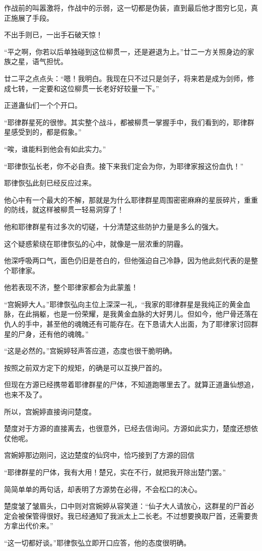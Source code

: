 \begin{this_body}
作战前的叫嚣激将，作战中的示弱，这一切都是伪装，直到最后他才图穷匕见，真正施展了手段。

不出手则已，一出手石破天惊！

“平之啊，你若以后单独碰到这位柳贯一，还是避退为上。”廿二一方关照身边的家族之星，语气担忧。

廿二平之点点头：“嗯！我明白。我现在只不过只是剑子，将来若是成为剑师，修成七转，一定要和这位柳贯一长老好好较量一下。”

正道蛊仙们一个个开口。

“耶律群星死的很惨。其实整个战斗，都被柳贯一掌握手中，我们看到的，耶律群星感受到的，都是假象。”

“唉，谁能料到他会有如此实力。”

“耶律恢弘长老，你不必自责。接下来我们定会为你，为耶律家报这份血仇！”

耶律恢弘此刻已经反应过来。

他心中有一个最大的不解，那就是为什么耶律群星周围密密麻麻的星辰碎片，重重的防线，就这样被柳贯一轻易洞穿了！

他和耶律群星有过多次的切磋，十分清楚这些防护力量是多么的强大。

这个疑惑萦绕在耶律恢弘的心中，就像是一层浓重的阴霾。

他深呼吸两口气，面色仍旧是苍白的，但他强迫自己冷静，因为他此刻代表的是整个耶律家。

他若表现不济，整个耶律家都会为此蒙羞！

“宫婉婷大人。”耶律恢弘向主位上深深一礼，“我家的耶律群星是我纯正的黄金血脉，在此捐躯，也是一份荣耀，是我黄金血脉的大好男儿。但如今，他尸骨还落在仇人的手中，甚至他的魂魄还有可能存在。在下恳请大人出面，为了耶律家讨回群星的尸身，还有他的魂魄。”

“这是必然的。”宫婉婷轻声答应道，态度也很干脆明确。

按照之前双方定下的规矩，的确是可以互换尸首的。

但现在方源已经携带着耶律群星的尸体，不知道跑哪里去了。就算正道蛊仙想追，也来不及了。

所以，宫婉婷直接询问楚度。

楚度对于方源的直接离去，也很意外，已经去信询问。方源如此实力，楚度还想依仗他呢。

宫婉婷那边刚问，这边楚度的仙窍中，恰巧接到了方源的回信

“耶律群星的尸体，我有大用！楚兄，实在不行，就把我开除出楚门罢。”

简简单单的两句话，却表明了方源势在必得，不会松口的决心。

楚度皱了皱眉头，口中则对宫婉婷从容笑道：“仙子大人请放心，这群星的尸首必定会被保管得很好。我已经通知了我派太上二长老。不过想要换取尸首，还需要贵方拿出代价来。”

“这一切都好谈。”耶律恢弘立即开口应答，他的态度很明确。

\end{this_body}

